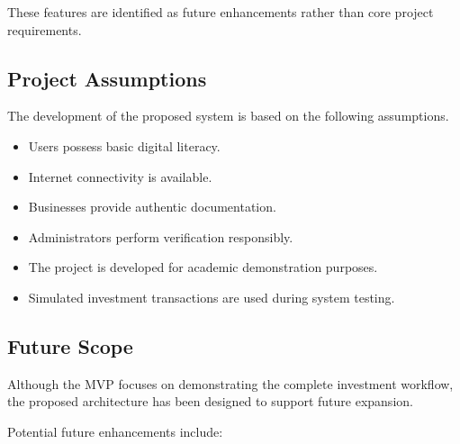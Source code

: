 These features are identified as future enhancements rather than core project requirements.


\subsection{Project Assumptions}

The development of the proposed system is based on the following assumptions.

\begin{itemize}

\item Users possess basic digital literacy.

\item Internet connectivity is available.

\item Businesses provide authentic documentation.

\item Administrators perform verification responsibly.

\item The project is developed for academic demonstration purposes.

\item Simulated investment transactions are used during system testing.

\end{itemize}


\subsection{Future Scope}

Although the MVP focuses on demonstrating the complete investment workflow, the proposed architecture has been designed to support future expansion.

Potential future enhancements include:

